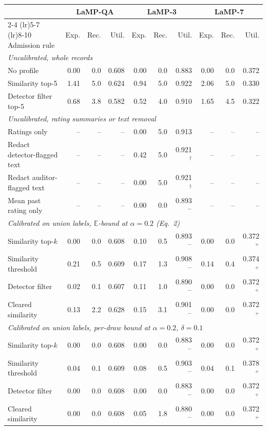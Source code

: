 \begin{tabular}{lrrrrrrrrr}
\toprule
 & \multicolumn{3}{c}{LaMP-QA} & \multicolumn{3}{c}{LaMP-3} & \multicolumn{3}{c}{LaMP-7} \\
\cmidrule(lr){2-4} \cmidrule(lr){5-7} \cmidrule(lr){8-10}
Admission rule & Exp. & Rec. & Util. & Exp. & Rec. & Util. & Exp. & Rec. & Util. \\
\midrule
\multicolumn{10}{l}{\emph{Uncalibrated, whole records}} \\
No profile & 0.00 & 0.0 & 0.608 & 0.00 & 0.0 & 0.883 & 0.00 & 0.0 & 0.372 \\
Similarity top-5 & 1.41 & 5.0 & 0.624 & 0.94 & 5.0 & 0.922 & 2.06 & 5.0 & 0.330 \\
Detector filter top-5 & 0.68 & 3.8 & 0.582 & 0.52 & 4.0 & 0.910 & 1.65 & 4.5 & 0.322 \\
\midrule
\multicolumn{10}{l}{\emph{Uncalibrated, rating summaries or text removal}} \\
Ratings only & -- & -- & -- & 0.00 & 5.0 & 0.913 & -- & -- & -- \\
Redact detector-flagged text & -- & -- & -- & 0.42 & 5.0 & 0.921$^{\dagger}$ & -- & -- & -- \\
Redact auditor-flagged text & -- & -- & -- & 0.00 & 5.0 & 0.921$^{\dagger}$ & -- & -- & -- \\
Mean past rating only & -- & -- & -- & 0.00 & 0.0 & 0.893$^{-}$ & -- & -- & -- \\
\midrule
\multicolumn{10}{l}{\emph{Calibrated on union labels, $\mathbb{E}$-bound at $\alpha=0.2$ (Eq.~2)}} \\
Similarity top-$k$ & 0.00 & 0.0 & 0.608 & 0.10 & 0.5 & 0.893$^{-}$ & 0.00 & 0.0 & 0.372$^{+}$ \\
Similarity threshold & 0.21 & 0.5 & 0.609 & 0.17 & 1.3 & 0.908$^{-}$ & 0.14 & 0.4 & 0.374$^{+}$ \\
Detector filter & 0.02 & 0.1 & 0.607 & 0.11 & 1.0 & 0.890$^{-}$ & 0.00 & 0.0 & 0.372$^{+}$ \\
Cleared similarity & 0.13 & 2.2 & 0.628 & 0.15 & 3.1 & 0.901$^{-}$ & 0.00 & 0.0 & 0.372$^{+}$ \\
\midrule
\multicolumn{10}{l}{\emph{Calibrated on union labels, per-draw bound at $\alpha=0.2$, $\delta=0.1$}} \\
Similarity top-$k$ & 0.00 & 0.0 & 0.608 & 0.00 & 0.0 & 0.883$^{-}$ & 0.00 & 0.0 & 0.372$^{+}$ \\
Similarity threshold & 0.04 & 0.1 & 0.609 & 0.08 & 0.5 & 0.903$^{-}$ & 0.04 & 0.1 & 0.378$^{+}$ \\
Detector filter & 0.00 & 0.0 & 0.608 & 0.00 & 0.0 & 0.883$^{-}$ & 0.00 & 0.0 & 0.372$^{+}$ \\
Cleared similarity & 0.00 & 0.0 & 0.608 & 0.05 & 1.8 & 0.880$^{-}$ & 0.00 & 0.0 & 0.372$^{+}$ \\
\bottomrule
\end{tabular}
